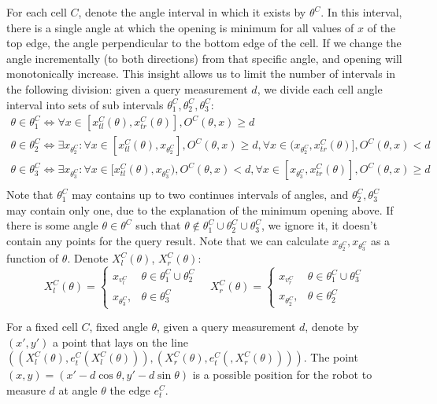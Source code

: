 \documentclass[a4paper,12pt]{extarticle}
\begin{document}
For each cell $C$, denote the angle interval in which it exists by $\theta^{C}$. In this interval, there is a single angle at which the opening is minimum for all values of $x$ of the top edge, the angle perpendicular to the bottom edge of the cell. If we change the angle incrementally (to both directions) from that specific angle, and opening will monotonically increase. This insight allows us to limit the number of intervals in the following division: given a query measurement $d$, we divide each cell angle interval into sets of sub intervals $\theta^{C}_{1},\theta^{C}_{2},\theta^{C}_{3}$:
\[ \begin{matrix}
    \theta \in \theta^{C}_{1} \iff \forall x \in [x^{C}_{tl}(\theta),x^{C}_{tr}(\theta)], O^{C}(\theta,x) \geq d \\
    \theta \in \theta^{C}_{2} \iff \exists x_{\theta^{C}_{2}}: \forall x \in [x^{C}_{tl}(\theta),x_{\theta^{C}_{2}}], O^{C}(\theta,x) \geq d, \forall x \in (x_{\theta^{C}_{2}},x^{C}_{tr}(\theta)], O^{C}(\theta,x) < d \\
    \theta \in \theta^{C}_{3} \iff \exists x_{\theta^{C}_{3}}: \forall x \in [x^{C}_{tl}(\theta),x_{\theta^{C}_{3}}), O^{C}(\theta,x) < d, \forall x \in [x_{\theta^{C}_{3}},x^{C}_{tr}(\theta)], O^{C}(\theta,x) \geq d \\
\end{matrix} \]
Note that $\theta^{C}_{1}$ may contains up to two continues intervals of angles, and $\theta^{C}_{2},\theta^{C}_{3}$ may contain only one, due to the explanation of the minimum opening above. If there is some angle $\theta \in \theta^{C}$ such that $\theta \notin \theta^{C}_{1} \cup \theta^{C}_{2} \cup \theta^{C}_{3}$, we ignore it, it doesn't contain any points for the query result. Note that we can calculate $x_{\theta^{C}_{2}},x_{\theta^{C}_{3}}$ as a function of $\theta$. Denote $X^{C}_{l}(\theta)$, $X^{C}_{r}(\theta)$:
\[ X^{C}_{l}(\theta)=\begin{cases}
    x_{v^{C}_{l}} & \theta \in \theta^{C}_{1} \cup \theta^{C}_{2} \\
    x_{\theta^{C}_{3}}, & \theta \in \theta^{C}_{3}
\end{cases} \quad
X^{C}_{r}(\theta)=\begin{cases}
    x_{v^{C}_{r}} & \theta \in \theta^{C}_{1} \cup \theta^{C}_{3} \\
    x_{\theta^{C}_{2}}, & \theta \in \theta^{C}_{2}
\end{cases} \]

For a fixed cell $C$, fixed angle $\theta$, given a query measurement $d$, denote by $(x',y')$ a point that lays on the line $((X^{C}_{l}(\theta),e^{C}_{t}(X^{C}_{l}(\theta))), (X^{C}_{r}(\theta),e^{C}_{t}(,X^{C}_{r}(\theta))))$. The point $(x,y)=(x'-d\cos \theta,y'-d\sin \theta)$ is a possible position for the robot to measure $d$ at angle $\theta$ the edge $e^{C}_{t}$.
\end{document}
